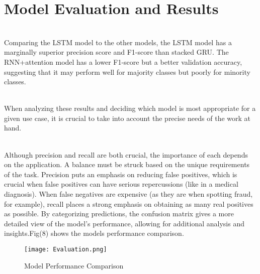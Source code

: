 \documentclass[conference]{IEEEtran}
\begin{document}
\section{Model Evaluation and Results}
\\ Comparing the LSTM model to the other models, the LSTM model has a marginally superior precision score and F1-score than stacked GRU.
The RNN+attention model has a lower F1-score but a better validation accuracy, suggesting that it may perform well for majority classes but poorly for minority classes. 

\\ When analyzing these results and deciding which model is most appropriate for a given use case, it is crucial to take into account the precise needs of the work at hand.

\\ Although precision and recall are both crucial, the importance of each depends on the application. A balance must be struck based on the unique requirements of the task.
Precision puts an emphasis on reducing false positives, which is crucial when false positives can have serious repercussions (like in a medical diagnosis).
When false negatives are expensive (as they are when spotting fraud, for example), recall places a strong emphasis on obtaining as many real positives as possible.
By categorizing predictions, the confusion matrix gives a more detailed view of the model's performance, allowing for additional analysis and insights.Fig(8) shows the models performance comparison.
\begin{figure}[htbp]
\centerline{\texttt{[image: Evaluation.png]}}
\caption{Model Performance Comparison}
\label{fig}
\end{figure}

\\ 
\end{document}
